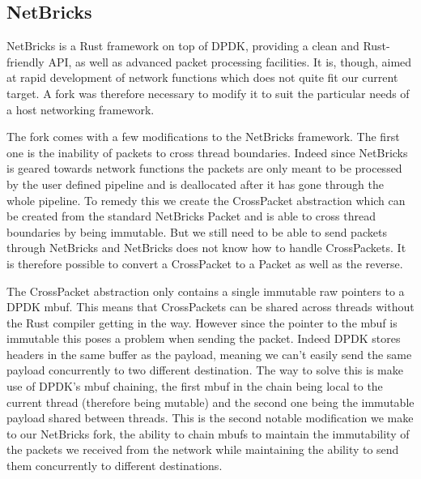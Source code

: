 \documentclass[11pt]{article}
\begin{document}
\subsection{NetBricks}
NetBricks is a Rust framework on top of DPDK, providing a clean and
Rust-friendly API, as well as advanced packet processing facilities.
It is, though, aimed at rapid development of network functions which
does not quite fit our current target. A fork was therefore necessary
to modify it to suit the particular needs of a host networking
framework.

The fork comes with a few modifications to the NetBricks
framework. The first one is the inability of packets to cross thread
boundaries. Indeed since NetBricks is geared towards network functions
the packets are only meant to be processed by the user defined
pipeline and is deallocated after it has gone through the whole
pipeline. To remedy this we create the CrossPacket abstraction which
can be created from the standard NetBricks Packet and is able to cross
thread boundaries by being immutable. But we still need to be able to
send packets through NetBricks and NetBricks does not know how to
handle CrossPackets. It is therefore possible to convert a CrossPacket
to a Packet as well as the reverse.

The CrossPacket abstraction only contains a single immutable raw
pointers to a DPDK mbuf. This means that CrossPackets can be shared
across threads without the Rust compiler getting in the way. However
since the pointer to the mbuf is immutable this poses a problem when
sending the packet. Indeed DPDK stores headers in the same buffer as
the payload, meaning we can't easily send the same payload
concurrently to two different destination. The way to solve this is
make use of DPDK's mbuf chaining, the first mbuf in the chain being
local to the current thread (therefore being mutable) and the second
one being the immutable payload shared between threads. This is the
second notable modification we make to our NetBricks fork, the ability
to chain mbufs to maintain the immutability of the packets we received
from the network while maintaining the ability to send them
concurrently to different destinations.
\end{document}
